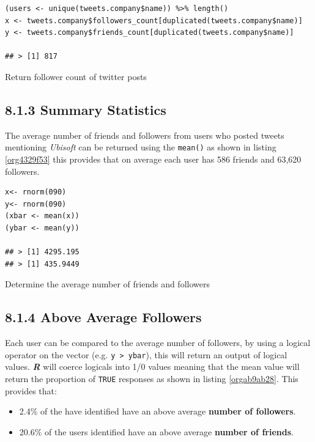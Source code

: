 \documentclass[11pt]{article}
\begin{document}
\begin{listing}[htbp]
\begin{verbatim}
(users <- unique(tweets.company$name)) %>% length()
x <- tweets.company$followers_count[duplicated(tweets.company$name)]
y <- tweets.company$friends_count[duplicated(tweets.company$name)]

## > [1] 817
\end{verbatim}
\caption{\label{orgd1cc3b8}Return follower count of twitter posts}
\end{listing}


\subsection{8.1.3 Summary Statistics}
\label{sec:org0b44c4f}
The average number of friends and followers from users who posted tweets mentioning \emph{Ubisoft} can be returned using the \texttt{mean()} as shown in listing \ref{org4329f53}
this provides that on average each user has 586 friends and 63,620 followers.

\begin{listing}[htbp]
\begin{verbatim}
x<- rnorm(090)
y<- rnorm(090)
(xbar <- mean(x))
(ybar <- mean(y))

## > [1] 4295.195
## > [1] 435.9449
\end{verbatim}
\caption{\label{org4329f53}Determine the average number of friends and followers}
\end{listing}

\subsection{8.1.4 Above Average Followers}
\label{sec:org2ee1e56}
Each user can be compared to the average number of followers, by using a logical
operator on the vector (e.g. \texttt{y > ybar}), this will return an output of logical
values. \textbf{\emph{R}} will coerce logicals into 1/0 values meaning that the mean value
will return the proportion of \texttt{TRUE} responses as shown in listing \ref{orgab9ab28}. This
provides that:

\begin{itemize}
\item 2.4\%  of the have identified have an above average \textbf{number of followers}.
\item 20.6\% of the users identified have an above average \textbf{number of friends}.
\end{itemize}
\end{document}
